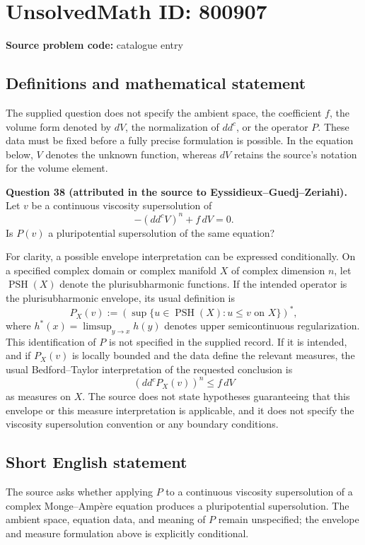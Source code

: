 \documentclass[11pt]{article}
\begin{document}
\section*{UnsolvedMath ID: 800907}
\textbf{Source problem code:} catalogue entry
\subsection{Definitions and mathematical statement}
The supplied question does not specify the ambient space, the coefficient \(f\), the volume form denoted by \(dV\), the normalization of \(dd^c\), or the operator \(P\). These data must be fixed before a fully precise formulation is possible. In the equation below, \(V\) denotes the unknown function, whereas \(dV\) retains the source's notation for the volume element.

\textbf{Question 38 (attributed in the source to Eyssidieux--Guedj--Zeriahi).} Let \(v\) be a continuous viscosity supersolution of
\[
-(dd^c V)^n+f\,dV=0.
\]
Is \(P(v)\) a pluripotential supersolution of the same equation?

For clarity, a possible envelope interpretation can be expressed conditionally. On a specified complex domain or complex manifold \(X\) of complex dimension \(n\), let \(\operatorname{PSH}(X)\) denote the plurisubharmonic functions. If the intended operator is the plurisubharmonic envelope, its usual definition is
\[
P_X(v):=\left(\sup\{u\in\operatorname{PSH}(X):u\leq v\text{ on }X\}\right)^*,
\]
where \(h^*(x)=\limsup_{y\to x}h(y)\) denotes upper semicontinuous regularization. This identification of \(P\) is not specified in the supplied record. If it is intended, and if \(P_X(v)\) is locally bounded and the data define the relevant measures, the usual Bedford--Taylor interpretation of the requested conclusion is
\[
(dd^c P_X(v))^n\leq f\,dV
\]
as measures on \(X\). The source does not state hypotheses guaranteeing that this envelope or this measure interpretation is applicable, and it does not specify the viscosity supersolution convention or any boundary conditions.
\subsection{Short English statement}
The source asks whether applying \(P\) to a continuous viscosity supersolution of a complex Monge--Amp\`ere equation produces a pluripotential supersolution. The ambient space, equation data, and meaning of \(P\) remain unspecified; the envelope and measure formulation above is explicitly conditional.
\end{document}
